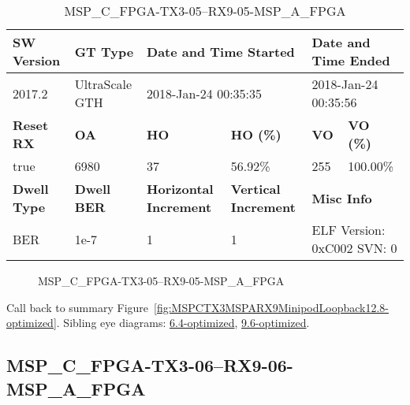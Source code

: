 \begin{table}[h]
\centering
\caption{MSP\_C\_FPGA-TX3-05--RX9-05-MSP\_A\_FPGA}
\label{tab:MSPCFPGATX305RX905MSPAFPGA12.8-optimized}
\begin{tabular}{@{}|l|l|l|l|l|l|@{}}
\toprule
\textbf{SW Version}                & \textbf{GT Type}   & \multicolumn{2}{l|}{\textbf{Date and Time Started}}            & \multicolumn{2}{l|}{\textbf{Date and Time Ended}}        \\ \midrule
2017.2                       & UltraScale GTH          & \multicolumn{2}{l|}{2018-Jan-24 00:35:35}                   & \multicolumn{2}{l|}{2018-Jan-24 00:35:56}               \\ \midrule
\textbf{Reset RX}                  & \textbf{OA} & \textbf{HO}   & \textbf{HO (\%)} & \textbf{VO} & \textbf{VO (\%)} \\ \midrule
true & 6980        & 37          & 56.92\%        & 255        & 100.00\%       \\ \midrule
\textbf{Dwell Type}                & \textbf{Dwell BER} & \textbf{Horizontal Increment} & \textbf{Vertical Increment}    & \multicolumn{2}{l|}{\textbf{Misc Info}}                  \\ \midrule
BER                            & 1e-7        & 1        & 1           & \multicolumn{2}{l|}{ELF Version: 0xC002 SVN: 0}                         \\ \bottomrule
\end{tabular}
\end{table}

\begin{figure}[h]
\caption{MSP\_C\_FPGA-TX3-05--RX9-05-MSP\_A\_FPGA} \label{fig:MSPCFPGATX305RX905MSPAFPGA12.8-optimized}
\end{figure}

Call back to summary Figure~\ref{fig:MSPCTX3MSPARX9MinipodLoopback12.8-optimized}.
Sibling eye diagrams: \hyperref[sec:MSPCFPGATX305RX905MSPAFPGA6.4-optimized]{6.4-optimized}, \hyperref[sec:MSPCFPGATX305RX905MSPAFPGA9.6-optimized]{9.6-optimized}.

\clearpage
\newpage


\subsection{MSP\_C\_FPGA-TX3-06--RX9-06-MSP\_A\_FPGA}\label{sec:MSPCFPGATX306RX906MSPAFPGA12.8-optimized}

